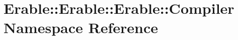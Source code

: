 \hypertarget{namespace_erable_1_1_erable_1_1_erable_1_1_compiler}{}\section{Erable\+::Erable\+::Erable\+::Compiler Namespace Reference}
\label{namespace_erable_1_1_erable_1_1_erable_1_1_compiler}
